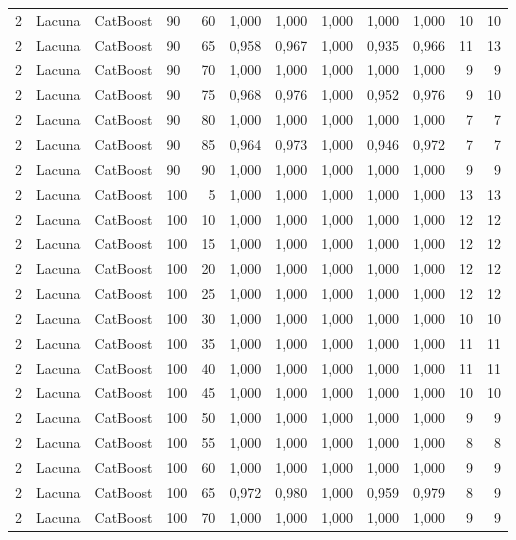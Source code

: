 \begin{longtable}{ccclrrrrrrrr}
2 & Lacuna & CatBoost & 90 & 60 & 1,000 & 1,000 & 1,000 & 1,000 & 1,000 & 10 & 10 \\
2 & Lacuna & CatBoost & 90 & 65 & 0,958 & 0,967 & 1,000 & 0,935 & 0,966 & 11 & 13 \\
2 & Lacuna & CatBoost & 90 & 70 & 1,000 & 1,000 & 1,000 & 1,000 & 1,000 & 9 & 9 \\
2 & Lacuna & CatBoost & 90 & 75 & 0,968 & 0,976 & 1,000 & 0,952 & 0,976 & 9 & 10 \\
2 & Lacuna & CatBoost & 90 & 80 & 1,000 & 1,000 & 1,000 & 1,000 & 1,000 & 7 & 7 \\
2 & Lacuna & CatBoost & 90 & 85 & 0,964 & 0,973 & 1,000 & 0,946 & 0,972 & 7 & 7 \\
2 & Lacuna & CatBoost & 90 & 90 & 1,000 & 1,000 & 1,000 & 1,000 & 1,000 & 9 & 9 \\
2 & Lacuna & CatBoost & 100 & 5 & 1,000 & 1,000 & 1,000 & 1,000 & 1,000 & 13 & 13 \\
2 & Lacuna & CatBoost & 100 & 10 & 1,000 & 1,000 & 1,000 & 1,000 & 1,000 & 12 & 12 \\
2 & Lacuna & CatBoost & 100 & 15 & 1,000 & 1,000 & 1,000 & 1,000 & 1,000 & 12 & 12 \\
2 & Lacuna & CatBoost & 100 & 20 & 1,000 & 1,000 & 1,000 & 1,000 & 1,000 & 12 & 12 \\
2 & Lacuna & CatBoost & 100 & 25 & 1,000 & 1,000 & 1,000 & 1,000 & 1,000 & 12 & 12 \\
2 & Lacuna & CatBoost & 100 & 30 & 1,000 & 1,000 & 1,000 & 1,000 & 1,000 & 10 & 10 \\
2 & Lacuna & CatBoost & 100 & 35 & 1,000 & 1,000 & 1,000 & 1,000 & 1,000 & 11 & 11 \\
2 & Lacuna & CatBoost & 100 & 40 & 1,000 & 1,000 & 1,000 & 1,000 & 1,000 & 11 & 11 \\
2 & Lacuna & CatBoost & 100 & 45 & 1,000 & 1,000 & 1,000 & 1,000 & 1,000 & 10 & 10 \\
2 & Lacuna & CatBoost & 100 & 50 & 1,000 & 1,000 & 1,000 & 1,000 & 1,000 & 9 & 9 \\
2 & Lacuna & CatBoost & 100 & 55 & 1,000 & 1,000 & 1,000 & 1,000 & 1,000 & 8 & 8 \\
2 & Lacuna & CatBoost & 100 & 60 & 1,000 & 1,000 & 1,000 & 1,000 & 1,000 & 9 & 9 \\
2 & Lacuna & CatBoost & 100 & 65 & 0,972 & 0,980 & 1,000 & 0,959 & 0,979 & 8 & 9 \\
2 & Lacuna & CatBoost & 100 & 70 & 1,000 & 1,000 & 1,000 & 1,000 & 1,000 & 9 & 9 \\

\end{longtable}
